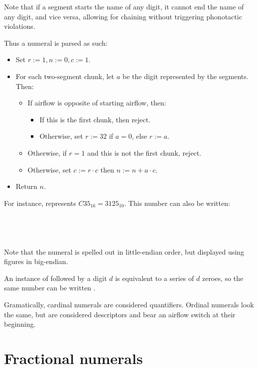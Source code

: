 \documentclass{book}
\begin{document}
Note that if a segment starts the name of any digit, it cannot end the name of any digit, and vice versa, allowing for chaining without triggering phonotactic violations.

Thus a numeral is parsed as such:

\begin{itemize}
  \item Set $r := 1, n := 0, c := 1$.
  \item For each two-segment chunk, let $a$ be the digit represented by the segments. Then:
  \begin{itemize}
    \item If airflow is opposite of starting airflow, then:
    \begin{itemize}
      \item If this is the first chunk, then reject.
      \item Otherwise, set $r := 32$ if $a = 0$, else $r := a$.
    \end{itemize}
    \item Otherwise, if $r = 1$ and this is not the first chunk, reject.
    \item Otherwise, set $c := r \cdot c$ then $n := n + a \cdot c$.
  \end{itemize}
  \item Return $n$.
\end{itemize}

For instance,  represents $C35_{16} = 3125_{10}$. This number can also be written: \\
~\\
 \\
 \\
 \\

Note that the numeral is spelled out in little-endian order, but displayed using figures in big-endian.

An instance of  followed by a digit $d$ is equivalent to a series of $d$ zeroes, so the same number can be written .

Gramatically, cardinal numerals are considered quantifiers. Ordinal numerals look the same, but are considered descriptors and bear an airflow switch at their beginning.

\section{Fractional numerals}
\end{document}
